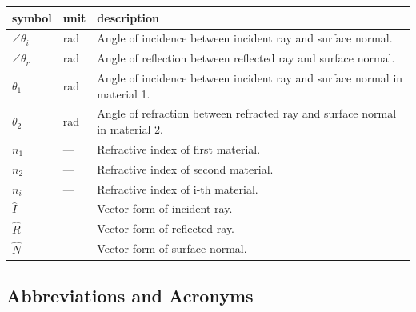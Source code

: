 \documentclass[12pt]{article}
\begin{document}
\renewcommand{\arraystretch}{1.2}
\noindent \begin{longtable*}{l l p{12cm}} \toprule
\textbf{symbol} & \textbf{unit} & \textbf{description}\\
\midrule 
$\angle\theta_{i}$ & \si[per-mode=symbol] {\radian} & Angle of incidence 
between incident ray and surface normal.
\\
$\angle\theta_{r}$ & \si[per-mode=symbol] {\radian} & Angle of reflection 
between reflected ray and surface normal.
\\
$\theta_{1}$ & \si[per-mode=symbol] {\radian} & Angle of incidence 
between incident ray and surface normal in material 1.
\\
$\theta_{2}$ & \si[per-mode=symbol] {\radian} & Angle of refraction 
between refracted ray and surface normal in material 2.
\\
$n_{1}$ & --- & Refractive index of first material.
\\
$n_{2}$ & --- & Refractive index of second material.
\\
$n_{i}$ & --- & Refractive index of i-th material.
\\
$\hat{I}$ & --- & Vector form of incident ray.
\\
$\hat{R}$ & --- & Vector form of reflected ray.
\\
$\hat{N}$ & --- & Vector form of surface normal.
\\
\bottomrule
\end{longtable*}

\subsection{Abbreviations and Acronyms}
\end{document}
